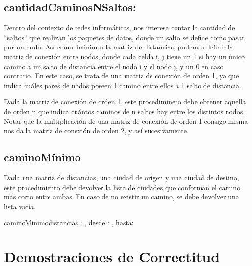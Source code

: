 \documentclass[10pt,a4paper]{article}
\begin{document}
\subsection{cantidadCaminosNSaltos:}

Dentro del contexto de redes informáticas, nos interesa contar la cantidad de “saltos” que realizan los paquetes de datos, donde un salto se define como pasar por un nodo.
Así como definimos la matriz de distancias, podemos definir la matriz de conexión entre nodos, donde cada celda i, j tiene un 1 si hay un único camino a un salto de distancia entre el nodo i y el nodo j, y un 0 en caso contrario.
En este caso, se trata de una matriz de conexión de orden 1, ya que indica cuáles pares de nodos poseen 1 camino entre ellos a 1 salto de distancia.

Dada la matriz de conexión de orden 1, este procedimineto debe obtener aquella de orden n que indica cuántos caminos de n saltos hay entre los distintos nodos.
Notar que la multiplicación de una matriz de conexión de orden 1 consigo misma nos da la matriz de conexión de orden 2, y así sucesivamente.


\subsection{caminoMínimo}
Dada una matriz de distancias, una ciudad de origen y una ciudad de destino, este procedimiento debe devolver la lista de ciudades que conforman el camino más corto entre ambas.
En caso de no existir un camino, se debe devolver una lista vacía.

\begin{proc}{caminoMinimo}{\In distancias : \TLista{\TLista{\ent}}, \In desde : \ent, \In hasta: \ent}{\TLista{\ent}}
\end{proc}

\section{Demostraciones de Correctitud}
\end{document}

